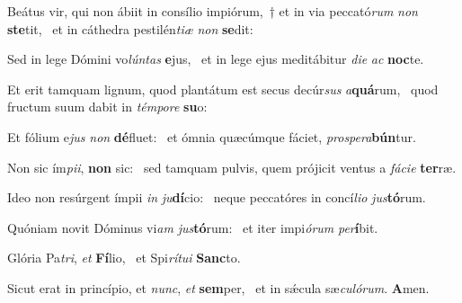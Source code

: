 \item Beátus vir, qui non ábiit in consílio impiórum,~† et in via peccató\textit{rum} \textit{non} \textbf{ste}tit,~\psstar{} et in cáthedra pestilén\textit{tiæ} \textit{non} \textbf{se}dit:
\item Sed in lege Dómini vo\textit{lúntas} \textbf{e}jus,~\psstar{} et in lege ejus meditábitur \textit{die} \textit{ac} \textbf{noc}te.
\item Et erit tamquam lignum, quod plantátum est secus decúr\textit{sus} \textit{a}\textbf{quá}rum,~\psstar{} quod fructum suum dabit in \textit{témpore} \textbf{su}o:
\item Et fólium e\textit{jus} \textit{non} \textbf{dé}fluet:~\psstar{} et ómnia quæcúmque fáciet, \textit{prospera}\textbf{bún}tur.
\item Non sic ím\textit{pii}, \textbf{non} sic:~\psstar{} sed tamquam pulvis, quem prójicit ventus a \textit{fácie} \textbf{ter}ræ.
\item Ideo non resúrgent ímpii \textit{in} \textit{ju}\textbf{dí}cio:~\psstar{} neque peccatóres in concí\textit{lio} \textit{jus}\textbf{tó}rum.
\item Quóniam novit Dóminus vi\textit{am} \textit{jus}\textbf{tó}rum:~\psstar{} et iter impi\textit{órum} \textit{per}\textbf{í}bit.
\item Glória Pa\textit{tri}, \textit{et} \textbf{Fí}lio,~\psstar{} et Spi\textit{rítui} \textbf{Sanc}to.
\item Sicut erat in princípio, et \textit{nunc}, \textit{et} \textbf{sem}per,~\psstar{} et in sǽcula sæ\textit{culórum}. \textbf{A}men.
